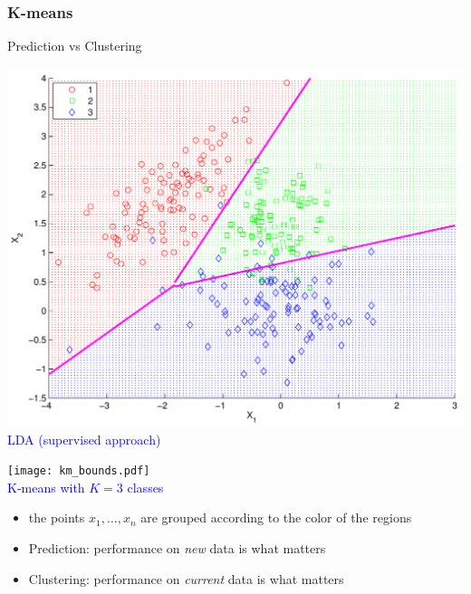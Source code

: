 \documentclass[compress, smaller, serif, 9pt]{beamer}
\begin{document}
\begin{frame}
   \frametitle{K-means}
   \begin{block}{Prediction vs Clustering}
   \end{block}
   \begin{minipage}{.49\textwidth}
   \begin{center}
    \includegraphics[width=.95\textwidth]{Figs/S02/linear_analysis_bounds.pdf}\\
    \textcolor{blue}{LDA (supervised approach)}
    \end{center}
    \end{minipage} \hfill
    \begin{minipage}{.49\textwidth}
   \begin{center}
    \texttt{[image: km\_bounds.pdf]}\\
    \textcolor{blue}{K-means with $K=3$ classes}
    \end{center}
    \end{minipage}
    \begin{itemize}
       \item the points $x_1,\ldots,x_n$ are grouped according to the color of the regions
       \item Prediction: performance on {\em new} data is what matters
       \item Clustering: performance on {\em current} data is what matters
    \end{itemize}
\end{frame}
\end{document}
